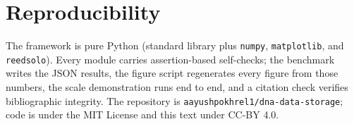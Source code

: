 \documentclass[11pt]{article}
\begin{document}
\section{Reproducibility}

The framework is pure Python (standard library plus \texttt{numpy}, \texttt{matplotlib}, and
\texttt{reedsolo}). Every module carries assertion-based self-checks; the benchmark writes the
JSON results, the figure script regenerates every figure from those numbers, the scale
demonstration runs end to end, and a citation check verifies bibliographic integrity. The
repository is \texttt{aayushpokhrel1/dna-data-storage}; code is under the MIT License and this
text under CC-BY 4.0.



\end{document}
